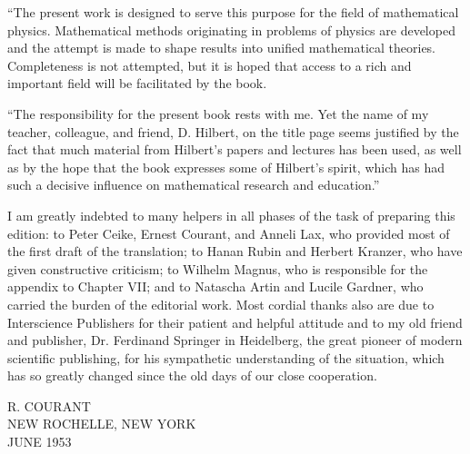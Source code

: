 ``The present work is designed to serve this purpose for the field of mathematical physics. Mathematical methods originating in problems of physics are developed and the attempt is made to shape results into unified mathematical theories. Completeness is not attempted, but it is hoped that access to a rich and important field will be facilitated by the book.

``The responsibility for the present book rests with me. Yet the name of my teacher, colleague, and friend, D. Hilbert, on the title page seems justified by the fact that much material from Hilbert's papers and lectures has been used, as well as by the hope that the book expresses some of Hilbert's spirit, which has had such a decisive influence on mathematical research and education.''

I am greatly indebted to many helpers in all phases of the task of preparing this edition: to Peter Ceike, Ernest Courant, and Anneli Lax, who provided most of the first draft of the translation; to Hanan Rubin and Herbert Kranzer, who have given constructive criticism; to Wilhelm Magnus, who is responsible for the appendix to Chapter VII; and to Natascha Artin and Lucile Gardner, who carried the burden of the editorial work. Most cordial thanks also are due to Interscience Publishers for their patient and helpful attitude and to my old friend and publisher, Dr. Ferdinand Springer in Heidelberg, the great pioneer of modern scientific publishing, for his sympathetic understanding of the situation, which has so greatly changed since the old days of our close cooperation.

\vspace{1.8em}
\begin{flushright}
R. COURANT\\
NEW ROCHELLE, NEW YORK\\
JUNE 1953
\end{flushright}
\clearpage
